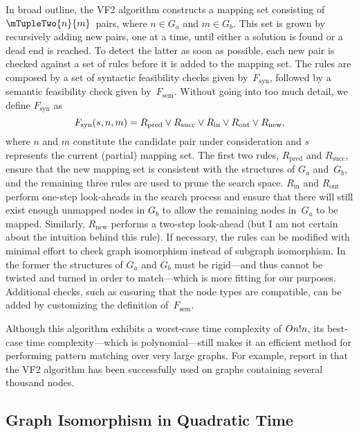 In broad outline, the \gls{VF2} algorithm constructs a mapping set consisting of
\mbox{$\mTupleTwo{n}{m}$}~pairs, where \mbox{$n \in G_a$} and \mbox{$m \in
  G_b$}.
%
This set is grown by recursively adding new pairs, one at a time, until
either a solution is found or a dead end is reached.
%
To detect the latter as
soon as possible, each new pair is checked against a set of rules before it is
added to the mapping set.
%
The rules are composed by a set of syntactic
feasibility checks given by~$F_{\text{syn}}$, followed by a semantic feasibility
check given by~$F_{\text{sem}}$.
%
Without going into too much detail, we define
$F_{\text{syn}}$ as
\begin{displaymath}
  F_{\text{syn}}(s, n, m) = R_{\text{pred}} \vee R_{\text{succ}} \vee
  R_{\text{in}} \vee R_{\text{out}} \vee R_{\text{new}},
\end{displaymath}
where $n$ and $m$ constitute the candidate pair under consideration and $s$
represents the current (partial) mapping set.
%
The first two rules,
$R_{\text{pred}}$ and $R_{\text{succ}}$, ensure that the new mapping set is
consistent with the structures of $G_a$ and~$G_b$, and the remaining three rules
are used to prune the search space.
%
$R_{\text{in}}$ and $R_{\text{out}}$ perform
one-step look-aheads in the search process and ensure that there will still
exist enough unmapped nodes in $G_b$ to allow the remaining \glspl{node}
in~$G_a$ to be mapped.
%
Similarly, $R_{\text{new}}$ performs a two-step
look-ahead (but I am not certain about the intuition behind this rule).
%
If
necessary, the rules can be modified with minimal effort to check \gls{graph
  isomorphism} instead of \gls{subgraph isomorphism}.
%
In the former the
structures of $G_a$ and $G_b$ must be rigid---and thus cannot be twisted and
turned in order to match---which is more fitting for our purposes.
%
Additional
checks, such as ensuring that the \gls{node} types are compatible, can be added
by customizing the definition of~$F_{\text{sem}}$.

Although this algorithm exhibits a worst-case time complexity of
\mbox{$O{n!n}$}, its best-case time complexity---which is
polynomial---still makes it an efficient method for performing \gls{pattern
  matching} over very large \glspl{graph}.
%
For example,
\citeauthor{Cordella2001} report in \cite{Cordella2001} that the \gls{VF2}
algorithm has been successfully used on \glspl{graph} containing several
thousand \glspl{node}.


\subsection{Graph Isomorphism in Quadratic Time}

